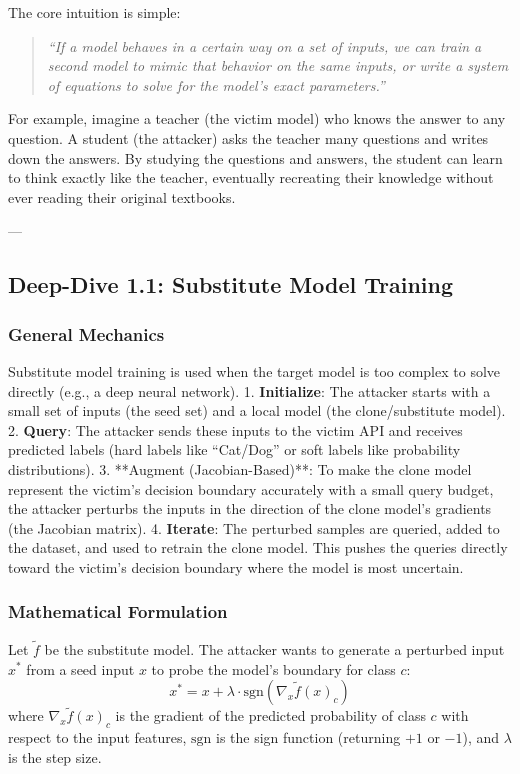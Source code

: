 \documentclass{article}
\begin{document}
The core intuition is simple:
\begin{quote}
    \textit{``If a model behaves in a certain way on a set of inputs, we can train a second model to mimic that behavior on the same inputs, or write a system of equations to solve for the model's exact parameters.''}
\end{quote}

For example, imagine a teacher (the victim model) who knows the answer to any question. A student (the attacker) asks the teacher many questions and writes down the answers. By studying the questions and answers, the student can learn to think exactly like the teacher, eventually recreating their knowledge without ever reading their original textbooks.

---

\subsection{Deep-Dive 1.1: Substitute Model Training}

\subsubsection{General Mechanics}
Substitute model training is used when the target model is too complex to solve directly (e.g., a deep neural network). 
1. \textbf{Initialize}: The attacker starts with a small set of inputs (the seed set) and a local model (the clone/substitute model).
2. \textbf{Query}: The attacker sends these inputs to the victim API and receives predicted labels (hard labels like ``Cat/Dog'' or soft labels like probability distributions).
3. **Augment (Jacobian-Based)**: To make the clone model represent the victim's decision boundary accurately with a small query budget, the attacker perturbs the inputs in the direction of the clone model's gradients (the Jacobian matrix).
4. \textbf{Iterate}: The perturbed samples are queried, added to the dataset, and used to retrain the clone model. This pushes the queries directly toward the victim's decision boundary where the model is most uncertain.

\subsubsection{Mathematical Formulation}
Let $\tilde{f}$ be the substitute model. The attacker wants to generate a perturbed input $x^*$ from a seed input $x$ to probe the model's boundary for class $c$:
\begin{equation}
    x^* = x + \lambda \cdot \text{sgn}\left( \nabla_x \tilde{f}(x)_c \right)
\end{equation}
where $\nabla_x \tilde{f}(x)_c$ is the gradient of the predicted probability of class $c$ with respect to the input features, $\text{sgn}$ is the sign function (returning $+1$ or $-1$), and $\lambda$ is the step size.
\end{document}
